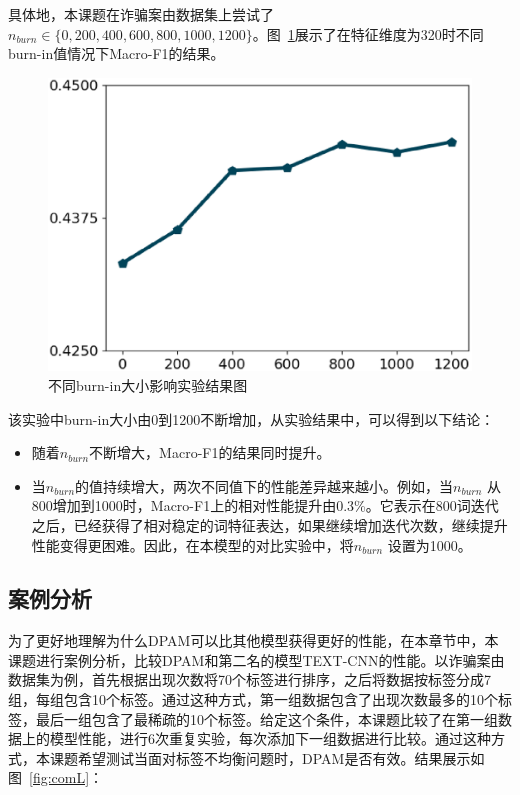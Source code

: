 具体地，本课题在诈骗案由数据集上尝试了$n_{burn}\in \{0,200,400,600,800,1000,1200\}$。图~\ref{fig:comS}展示了在特征维度为320时不同burn-in值情况下Macro-F1的结果。
\begin{figure}[htb]%
\vspace{-10pt}
\centering
\includegraphics[scale=0.5, clip=true]{./sources/dpam_comS.eps}
\vspace{-20pt}
\caption{\label{fig:comS} 不同burn-in大小影响实验结果图}
\vspace{-10pt}
\end{figure}

该实验中burn-in大小由0到1200不断增加，从实验结果中，可以得到以下结论：
\begin{itemize}
    \item 随着$n_{burn}$不断增大，Macro-F1的结果同时提升。
    \item 当$n_{burn}$的值持续增大，两次不同值下的性能差异越来越小。例如，当$n_{burn}$ 从800增加到1000时，Macro-F1上的相对性能提升由0.3\%。它表示在800词迭代之后，已经获得了相对稳定的词特征表达，如果继续增加迭代次数，继续提升性能变得更困难。因此，在本模型的对比实验中，将$n_{burn}$ 设置为1000。
\end{itemize}

\subsection{案例分析}
为了更好地理解为什么DPAM可以比其他模型获得更好的性能，在本章节中，本课题进行案例分析，比较DPAM和第二名的模型TEXT-CNN的性能。以诈骗案由数据集为例，首先根据出现次数将70个标签进行排序，之后将数据按标签分成7组，每组包含10个标签。通过这种方式，第一组数据包含了出现次数最多的10个标签，最后一组包含了最稀疏的10个标签。给定这个条件，本课题比较了在第一组数据上的模型性能，进行6次重复实验，每次添加下一组数据进行比较。通过这种方式，本课题希望测试当面对标签不均衡问题时，DPAM是否有效。结果展示如图~\ref{fig:comL}：

